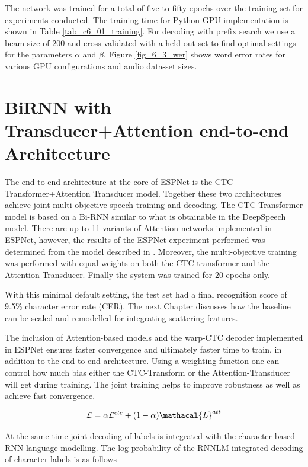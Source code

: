 The network was trained for a total of five to fifty epochs over the training set for experiments conducted. The training time for Python GPU implementation is shown in Table \ref{tab_c6_01_training}.  For decoding with prefix search we use a beam size of $200$ and cross-validated with a held-out set to find optimal settings for the parameters $\alpha$ and $\beta$. Figure \ref{fig_6_3_wer} shows word error rates for various GPU configurations and audio data-set sizes.

\startblue
\section{BiRNN with Transducer+Attention end-to-end Architecture}\label{sec_7_5_blstm_t}

The end-to-end architecture at the core of ESPNet is the CTC-Transformer+Attention Transducer model.  Together these two architectures achieve joint multi-objective speech training and decoding.  The CTC-Transformer model is based on a Bi-RNN similar to what is obtainable in the DeepSpeech model.  There are up to 11 variants of Attention networks implemented in ESPNet, however, the results of the ESPNet experiment performed was determined from the model described in \cite{chorowski2015attention}.  Moreover, the multi-objective training was performed with equal weights on both the CTC-transformer and the Attention-Transducer.  Finally the system was trained for 20 epochs only.

With this minimal default setting, the test set had a final recognition score of 9.5\% character error rate (CER).  The next Chapter discusses how the baseline can be scaled and remodelled for integrating scattering features.

The inclusion of Attention-based models and the warp-CTC decoder implemented in ESPNet ensures faster convergence and ultimately faster time to train, in addition to the end-to-end architecture.  Using a weighting function  one can control how much bias either the CTC-Transform or the Attention-Transducer will get during training.  The joint training helps to improve robustness as well as achieve fast convergence.

\begin{equation}
    \mathcal{L}=\alpha\mathcal{L}^{ctc}+(1-\alpha)\mathacal{L}^{att}
    \label{eqn_c7_esp00}
\end{equation}

At the same time joint decoding of labels is integrated with the character based RNN-language modelling. The log probability of the RNNLM-integrated decoding of character labels is as follows

